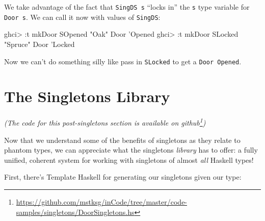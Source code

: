 \documentclass[]{article}
\newenvironment{Shaded}{\begin{snugshade}}{\end{snugshade}}
\newcommand{\CharTok}[1]{\textcolor[rgb]{0.31,0.60,0.02}{#1}}
\newcommand{\CommentTok}[1]{\textcolor[rgb]{0.56,0.35,0.01}{\textit{#1}}}
\newcommand{\DataTypeTok}[1]{\textcolor[rgb]{0.13,0.29,0.53}{#1}}
\newcommand{\FunctionTok}[1]{\textcolor[rgb]{0.00,0.00,0.00}{#1}}
\newcommand{\KeywordTok}[1]{\textcolor[rgb]{0.13,0.29,0.53}{\textbf{#1}}}
\newcommand{\NormalTok}[1]{#1}
\newcommand{\StringTok}[1]{\textcolor[rgb]{0.31,0.60,0.02}{#1}}
\renewcommand{\href}[2]{#2\footnote{\url{#1}}}
\begin{document}
We take advantage of the fact that \texttt{SingDS\ s} ``locks in'' the
\texttt{s} type variable for \texttt{Door\ s}. We can call it now with values of
\texttt{SingDS}:

\begin{Shaded}
\begin{Highlighting}[]
\NormalTok{ghci}\FunctionTok{>} \FunctionTok{:}\NormalTok{t mkDoor }\DataTypeTok{SOpened} \StringTok{"Oak"}
\DataTypeTok{Door} \CharTok{'Opened}
\NormalTok{ghci}\FunctionTok{>} \FunctionTok{:}\NormalTok{t mkDoor }\DataTypeTok{SLocked} \StringTok{"Spruce"}
\DataTypeTok{Door} \CharTok{'Locked}
\end{Highlighting}
\end{Shaded}

Now we can't do something silly like pass in \texttt{SLocked} to get a
\texttt{Door\ \textquotesingle{}Opened}.

\hypertarget{the-singletons-library}{%
\section{The Singletons Library}\label{the-singletons-library}}

\emph{(The code for this post-singletons section is available
\href{https://github.com/mstksg/inCode/tree/master/code-samples/singletons/DoorSingletons.hs}{on
github})}

Now that we understand some of the benefits of singletons as they relate to
phantom types, we can appreciate what the singletons \emph{library} has to
offer: a fully unified, coherent system for working with singletons of almost
\emph{all} Haskell types!

First, there's Template Haskell for generating our singletons given our type:

\begin{Shaded}
\end{Shaded}
\end{document}
